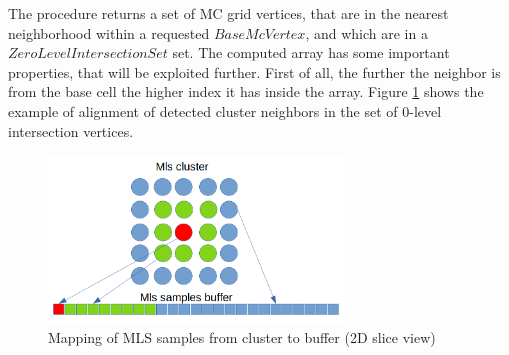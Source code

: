 The procedure returns a set of MC grid vertices, that are in the nearest neighborhood within a requested $BaseMcVertex$, and which are in a $ZeroLevelIntersectionSet$ set. The computed array has some important properties, that will be exploited further. First of all, the further the neighbor is from the base cell the higher index it has inside the array. Figure \ref{fig:mls_neighbor_alignment} shows the example of alignment of detected cluster neighbors in the set of 0-level intersection vertices.

\begin{figure}[h]
	\begin{center}
		\includegraphics[width=0.7\textwidth]{figures/MlsSamplesBufferAlignment.png}
	\end{center}
	\caption{Mapping of MLS samples from cluster to buffer (2D slice view)} \label{fig:mls_neighbor_alignment}
\end{figure}
